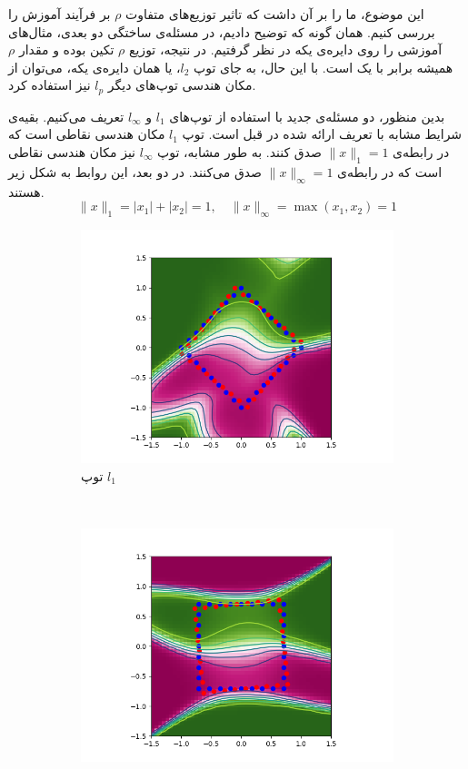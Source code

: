 \documentclass[12pt,onecolumn,a4paper]{article}
\begin{document}
این موضوع، ما را بر آن داشت که تاثیر توزیع‌های متفاوت $\rho$ بر فرآیند آموزش را بررسی کنیم. همان گونه که توضیح دادیم، در مسئله‌ی ساختگی دو بعدی، مثال‌های آموزشی را روی دایره‌ی یکه در نظر گرفتیم. در نتیجه، توزیع $\rho$ تکین بوده و مقدار $\rho$ همیشه برابر با یک است. با این حال، به  جای توپ $l_2$، یا همان دایره‌ی یکه، می‌توان از مکان هندسی توپ‌های دیگر $l_p$ نیز استفاده کرد.

بدین منظور، دو مسئله‌ی جدید با استفاده از توپ‌های $l_1$ و $l_\infty$ تعریف می‌کنیم. بقیه‌ی شرایط مشابه با تعریف ارائه شده در قبل است. توپ $l_1$ مکان هندسی نقاطی است که در رابطه‌ی $\|x\|_1=1$ صدق کنند. به طور مشابه، توپ $l_\infty$ نیز مکان هندسی نقاطی است که در رابطه‌ی $\|x\|_\infty=1$ صدق می‌کنند. در دو بعد، این روابط به شکل زیر هستند.
\[
\|x\|_1=|x_1|+|x_2|=1, \quad \|x\|_\infty=\max(x_1, x_2)=1
\]

\begin{figure}
	\centering
	\begin{subfigure}[b]{0.45\textwidth}
		\includegraphics[width=\textwidth]{2d_l1.png}
		\caption{توپ $l_1$}
		\label{fig:ball1}
	\end{subfigure}
	~ %
	\begin{subfigure}[b]{0.45\textwidth}
		\includegraphics[width=\textwidth]{2d_linf.png}

\end{subfigure}
\end{figure}
\end{document}
